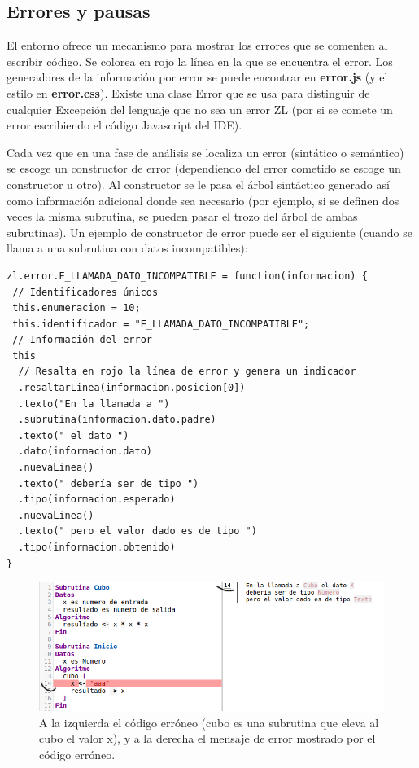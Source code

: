 \documentclass{report}
\begin{document}
	
	\subsection{Errores y pausas}
	
	El entorno ofrece un mecanismo para mostrar los errores que se comenten al escribir código. Se colorea en rojo la línea en la que se encuentra el error. Los generadores de la información por error se puede encontrar en \textbf{error.js} (y el estilo en \textbf{error.css}). Existe una clase Error que se usa para distinguir de cualquier Excepción del lenguaje que no sea un error ZL (por si se comete un error escribiendo el código Javascript del IDE).
	
	\vspace{10px}
	
	Cada vez que en una fase de análisis se localiza un error (sintático o semántico) se escoge un constructor de error (dependiendo del error cometido se escoge un constructor u otro). Al constructor se le pasa el árbol sintáctico generado así como información adicional donde sea necesario (por ejemplo, si se definen dos veces la misma subrutina, se pueden pasar el trozo del árbol de ambas subrutinas). Un ejemplo de constructor de error puede ser el siguiente (cuando se llama a una subrutina con datos incompatibles):
	
	\begin{BVerbatim}
zl.error.E_LLAMADA_DATO_INCOMPATIBLE = function(informacion) {
 // Identificadores únicos
 this.enumeracion = 10; 
 this.identificador = "E_LLAMADA_DATO_INCOMPATIBLE"; 
 // Información del error
 this
  // Resalta en rojo la línea de error y genera un indicador
  .resaltarLinea(informacion.posicion[0]) 
  .texto("En la llamada a ")
  .subrutina(informacion.dato.padre)
  .texto(" el dato ")
  .dato(informacion.dato)
  .nuevaLinea()
  .texto(" debería ser de tipo ")
  .tipo(informacion.esperado)
  .nuevaLinea()
  .texto(" pero el valor dado es de tipo ")
  .tipo(informacion.obtenido)
}
	\end{BVerbatim}
	
	\begin{figure}
		\centering
		\includegraphics[width=1\linewidth]{error}
		\caption[Ejemplo de código erróneo y mensaje de error.]{A la izquierda el código erróneo (cubo es una subrutina que eleva al cubo el valor x), y a la derecha el mensaje de error mostrado por el código erróneo.}
		\label{fig:error}
	\end{figure}
	
\end{document}
